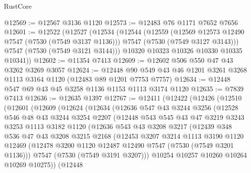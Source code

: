\begin{lexlean}{RustCore}
\begin{coremodule}
@12569 := @12567 @3136 @1120
@12573 := @12483 @76 @1171 @7652 @7656
@12601 := @12522
    (@12527
      (@12534
        (@12544
          (@12559
            (@12569 @12573 @12490 @7547 (@7530 (@7549 @3137 @1136)))
            @7547
            (@7530 (@7549 @3127 @3143)))
          @7547
          (@7530 (@7549 @3121 @3144)))
        @10320
        @10323
        @10326
        @10330
        @10335
        @10341))
@12602 := @11354 @7413
@12609 := @12602 @506 @550 @47 @43 @3262 @3269 @3057
@12624 := @12448 @90 @549 @43 @46 @1201 @3261 @3268 @1113 @3164 @1120 (@12483 @89 @1201 @7753 @7757)
@12634 := @12448 @547 @69 @43 @45 @3258 @1136 @1153 @1113 @3174 @1120
@12635 := @7839 @7413
@12636 := @12635 @1397
@12767 := @12411
    (@12422
      (@12426
        (@12510
          (@12601
            (@12609
              (@12624
                (@12634
                  (@12636
                    @547
                    @43
                    @3244
                    @3256
                    (@12528
                      @546
                      @48
                      @43
                      @3244
                      @3254
                      @2207
                      (@12448
                        @543
                        @545
                        @43
                        @47
                        @3219
                        @3243
                        @3253
                        @1113
                        @3182
                        @1120
                        (@12636
                          @543
                          @43
                          @3208
                          @3217
                          (@12439
                            @348
                            @536
                            @47
                            @43
                            @3208
                            @3215
                            @2168
                            (@12453
                              @3207
                              @3214
                              @1113
                              @3190
                              @1120
                              @12469
                              (@12478 @3200 @1120 @12487 @12490 @7547 (@7530 (@7549 @3201 @1136)))
                              @7547
                              (@7530 (@7549 @3191 @3207)))
                            @10254
                            @10257
                            @10260
                            @10264
                            @10269
                            @10275))
                        (@12448

\end{coremodule}
\end{lexlean}
